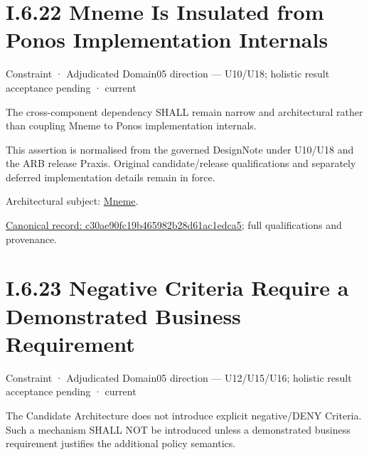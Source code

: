 \section*{I.6.22 Mneme Is Insulated from Ponos Implementation Internals}
\label{navigation:I.6.22}

\label{element:c30ae90fc19b465982b28d61ac1edca5}
{\small Constraint · Adjudicated Domain05 direction — U10/U18; holistic result acceptance pending · current}\par

The cross-component dependency SHALL remain narrow and architectural rather than coupling Mneme to Ponos implementation internals.



This assertion is normalised from the governed DesignNote under U10/U18 and the ARB release Praxis. Original candidate/release qualifications and separately deferred implementation details remain in force.



Architectural subject: \hyperref[element:1af8a56358f7429fabfb57be66542a99]{Mneme}.


{\footnotesize \href{../../../../../../../../continuum/motivation/constraint/c30ae90fc19b465982b28d61ac1edca5.md}{Canonical record: c30ae90fc19b465982b28d61ac1edca5}; full qualifications and provenance.}\par
\section*{I.6.23 Negative Criteria Require a Demonstrated Business Requirement}
\label{navigation:I.6.23}

\label{element:820e647c43614052aa25e385d6fe1dac}
{\small Constraint · Adjudicated Domain05 direction — U12/U15/U16; holistic result acceptance pending · current}\par

The Candidate Architecture does not introduce explicit negative/DENY Criteria. Such a mechanism SHALL NOT be introduced unless a demonstrated business requirement justifies the additional policy semantics.



